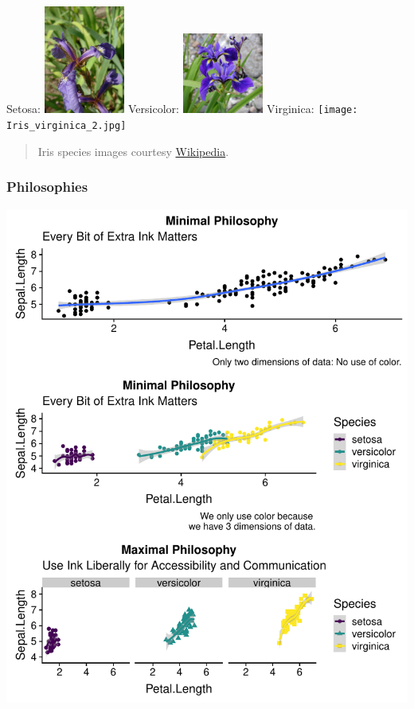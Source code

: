 \documentclass[]{tufte-handout}
\begin{document}
Setosa:
\includegraphics[width=0.2\textwidth,height=\textheight]{Kosaciec_szczecinkowaty_Iris_setosa.jpg}
Versicolor:
\includegraphics[width=0.2\textwidth,height=\textheight]{Blue_Flag_Ottawa.jpg}
Virginica:
\texttt{[image: Iris\_virginica\_2.jpg]}

\begin{quote}
Iris species images courtesy
\href{https://www.wikipedia.org/}{Wikipedia}.
\end{quote}

\hypertarget{philosophies}{%
\subsubsection{Philosophies}\label{philosophies}}

\begin{marginfigure}
\includegraphics{design_files/figure-latex/unnamed-chunk-10-1} \end{marginfigure}
\end{document}
